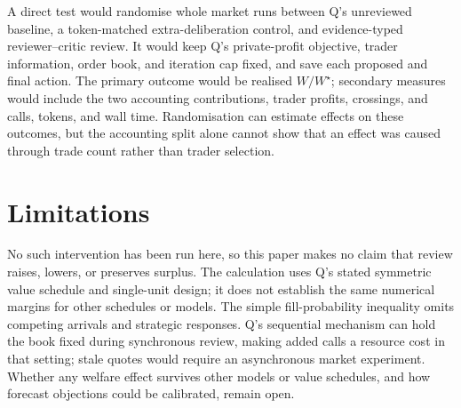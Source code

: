 \documentclass{article}
\begin{document}
A direct test would randomise whole market runs between Q's unreviewed baseline, a token-matched
extra-deliberation control, and evidence-typed reviewer--critic review. It would keep Q's private-profit
objective, trader information, order book, and iteration cap fixed, and save each proposed and final
action. The primary outcome would be realised \(W/W^\star\); secondary measures would include the two
accounting contributions, trader profits, crossings, and calls, tokens, and wall time. Randomisation can
estimate effects on these outcomes, but the accounting split alone cannot show that an effect was caused
through trade count rather than trader selection.

\section{Limitations}

No such intervention has been run here, so this paper makes no claim that review raises, lowers, or
preserves surplus. The calculation uses Q's stated symmetric value schedule and single-unit design; it
does not establish the same numerical margins for other schedules or models. The simple fill-probability
inequality omits competing arrivals and strategic responses. Q's sequential mechanism can hold the book
fixed during synchronous review, making added calls a resource cost in that setting; stale quotes would
require an asynchronous market experiment. Whether any welfare effect survives other models or value
schedules, and how forecast objections could be calibrated, remain open.

\clearpage


\end{document}
